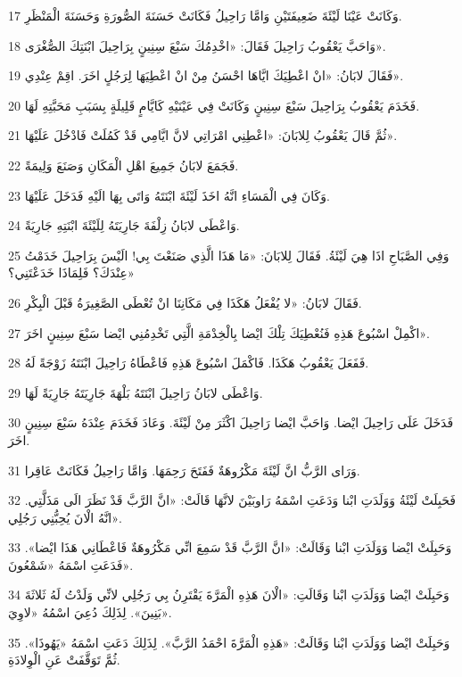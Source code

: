\par 17 وَكَانَتْ عَيْنَا لَيْئَةَ ضَعِيفَتَيْنِ وَامَّا رَاحِيلُ فَكَانَتْ حَسَنَةَ الصُّورَةِ وَحَسَنَةَ الْمَنْظَرِ.
\par 18 وَاحَبَّ يَعْقُوبُ رَاحِيلَ فَقَالَ: «اخْدِمُكَ سَبْعَ سِنِينٍ بِرَاحِيلَ ابْنَتِكَ الصُّغْرَى».
\par 19 فَقَالَ لابَانُ: «انْ اعْطِيَكَ ايَّاهَا احْسَنُ مِنْ انْ اعْطِيَهَا لِرَجُلٍ اخَرَ. اقِمْ عِنْدِي».
\par 20 فَخَدَمَ يَعْقُوبُ بِرَاحِيلَ سَبْعَ سِنِينٍ وَكَانَتْ فِي عَيْنَيْهِ كَايَّامٍ قَلِيلَةٍ بِسَبَبِ مَحَبَّتِهِ لَهَا.
\par 21 ثُمَّ قَالَ يَعْقُوبُ لِلابَانَ: «اعْطِنِي امْرَاتِي لانَّ ايَّامِي قَدْ كَمُلَتْ فَادْخُلَ عَلَيْهَا».
\par 22 فَجَمَعَ لابَانُ جَمِيعَ اهْلِ الْمَكَانِ وَصَنَعَ وَلِيمَةً.
\par 23 وَكَانَ فِي الْمَسَاءِ انَّهُ اخَذَ لَيْئَةَ ابْنَتَهُ وَاتَى بِهَا الَيْهِ فَدَخَلَ عَلَيْهَا.
\par 24 وَاعْطَى لابَانُ زِلْفَةَ جَارِيَتَهُ لِلَيْئَةَ ابْنَتِهِ جَارِيَةً.
\par 25 وَفِي الصَّبَاحِ اذَا هِيَ لَيْئَةُ. فَقَالَ لِلابَانَ: «مَا هَذَا الَّذِي صَنَعْتَ بِي! الَيْسَ بِرَاحِيلَ خَدَمْتُ عِنْدَكَ؟ فَلِمَاذَا خَدَعْتَنِي؟»
\par 26 فَقَالَ لابَانُ: «لا يُفْعَلُ هَكَذَا فِي مَكَانِنَا انْ تُعْطَى الصَّغِيرَةُ قَبْلَ الْبِكْرِ.
\par 27 اكْمِلْ اسْبُوعَ هَذِهِ فَنُعْطِيَكَ تِلْكَ ايْضا بِالْخِدْمَةِ الَّتِي تَخْدِمُنِي ايْضا سَبْعَ سِنِينٍ اخَرَ».
\par 28 فَفَعَلَ يَعْقُوبُ هَكَذَا. فَاكْمَلَ اسْبُوعَ هَذِهِ فَاعْطَاهُ رَاحِيلَ ابْنَتَهُ زَوْجَةً لَهُ.
\par 29 وَاعْطَى لابَانُ رَاحِيلَ ابْنَتَهُ بَلْهَةَ جَارِيَتَهُ جَارِيَةً لَهَا.
\par 30 فَدَخَلَ عَلَى رَاحِيلَ ايْضا. وَاحَبَّ ايْضا رَاحِيلَ اكْثَرَ مِنْ لَيْئَةَ. وَعَادَ فَخَدَمَ عِنْدَهُ سَبْعَ سِنِينٍ اخَرَ.
\par 31 وَرَاى الرَّبُّ انَّ لَيْئَةَ مَكْرُوهَةٌ فَفَتَحَ رَحِمَهَا. وَامَّا رَاحِيلُ فَكَانَتْ عَاقِرا.
\par 32 فَحَبِلَتْ لَيْئَةُ وَوَلَدَتِ ابْنا وَدَعَتِ اسْمَهُ رَاوبَيْنَ لانَّهَا قَالَتْ: «انَّ الرَّبَّ قَدْ نَظَرَ الَى مَذَلَّتِي. انَّهُ الْانَ يُحِبُّنِي رَجُلِي».
\par 33 وَحَبِلَتْ ايْضا وَوَلَدَتِ ابْنا وَقَالَتْ: «انَّ الرَّبَّ قَدْ سَمِعَ انِّي مَكْرُوهَةٌ فَاعْطَانِي هَذَا ايْضا». فَدَعَتِ اسْمَهُ «شَمْعُونَ».
\par 34 وَحَبِلَتْ ايْضا وَوَلَدَتِ ابْنا وَقَالَتِ: «الْانَ هَذِهِ الْمَرَّةَ يَقْتَرِنُ بِي رَجُلِي لانِّي وَلَدْتُ لَهُ ثَلاثَةَ بَنِينَ». لِذَلِكَ دُعِيَ اسْمُهُ «لاوِيَ».
\par 35 وَحَبِلَتْ ايْضا وَوَلَدَتِ ابْنا وَقَالَتْ: «هَذِهِ الْمَرَّةَ احْمَدُ الرَّبَّ». لِذَلِكَ دَعَتِ اسْمَهُ «يَهُوذَا». ثُمَّ تَوَقَّفَتْ عَنِ الْوِلادَةِ.


